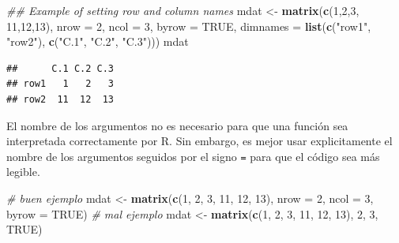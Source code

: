 \documentclass[
]{book}
\newenvironment{Shaded}{\begin{snugshade}}{\end{snugshade}}
\newcommand{\CommentTok}[1]{\textcolor[rgb]{0.56,0.35,0.01}{\textit{#1}}}
\newcommand{\DataTypeTok}[1]{\textcolor[rgb]{0.13,0.29,0.53}{#1}}
\newcommand{\DecValTok}[1]{\textcolor[rgb]{0.00,0.00,0.81}{#1}}
\newcommand{\KeywordTok}[1]{\textcolor[rgb]{0.13,0.29,0.53}{\textbf{#1}}}
\newcommand{\NormalTok}[1]{#1}
\newcommand{\OtherTok}[1]{\textcolor[rgb]{0.56,0.35,0.01}{#1}}
\newcommand{\StringTok}[1]{\textcolor[rgb]{0.31,0.60,0.02}{#1}}
\begin{document}
\begin{Shaded}
\begin{Highlighting}[]
\CommentTok{## Example of setting row and column names}
\NormalTok{mdat <-}\StringTok{ }\KeywordTok{matrix}\NormalTok{(}\KeywordTok{c}\NormalTok{(}\DecValTok{1}\NormalTok{,}\DecValTok{2}\NormalTok{,}\DecValTok{3}\NormalTok{, }\DecValTok{11}\NormalTok{,}\DecValTok{12}\NormalTok{,}\DecValTok{13}\NormalTok{), }\DataTypeTok{nrow =} \DecValTok{2}\NormalTok{, }\DataTypeTok{ncol =} \DecValTok{3}\NormalTok{, }\DataTypeTok{byrow =} \OtherTok{TRUE}\NormalTok{,}
               \DataTypeTok{dimnames =} \KeywordTok{list}\NormalTok{(}\KeywordTok{c}\NormalTok{(}\StringTok{"row1"}\NormalTok{, }\StringTok{"row2"}\NormalTok{),}
                               \KeywordTok{c}\NormalTok{(}\StringTok{"C.1"}\NormalTok{, }\StringTok{"C.2"}\NormalTok{, }\StringTok{"C.3"}\NormalTok{)))}
\NormalTok{mdat}
\end{Highlighting}
\end{Shaded}

\begin{verbatim}
##      C.1 C.2 C.3
## row1   1   2   3
## row2  11  12  13
\end{verbatim}

El nombre de los argumentos no es necesario para que una función sea interpretada correctamente por R. Sin embargo, es mejor usar explicitamente el nombre de los argumentos seguidos por el signo \texttt{=} para que el código sea más legible.

\begin{Shaded}
\begin{Highlighting}[]
\CommentTok{# buen ejemplo}
\NormalTok{mdat <-}\StringTok{ }\KeywordTok{matrix}\NormalTok{(}\KeywordTok{c}\NormalTok{(}\DecValTok{1}\NormalTok{, }\DecValTok{2}\NormalTok{, }\DecValTok{3}\NormalTok{, }\DecValTok{11}\NormalTok{, }\DecValTok{12}\NormalTok{, }\DecValTok{13}\NormalTok{), }\DataTypeTok{nrow =} \DecValTok{2}\NormalTok{, }\DataTypeTok{ncol =} \DecValTok{3}\NormalTok{, }\DataTypeTok{byrow =} \OtherTok{TRUE}\NormalTok{)}
\CommentTok{# mal ejemplo}
\NormalTok{mdat <-}\StringTok{ }\KeywordTok{matrix}\NormalTok{(}\KeywordTok{c}\NormalTok{(}\DecValTok{1}\NormalTok{, }\DecValTok{2}\NormalTok{, }\DecValTok{3}\NormalTok{, }\DecValTok{11}\NormalTok{, }\DecValTok{12}\NormalTok{, }\DecValTok{13}\NormalTok{), }\DecValTok{2}\NormalTok{, }\DecValTok{3}\NormalTok{, }\OtherTok{TRUE}\NormalTok{)}
\end{Highlighting}
\end{Shaded}
\end{document}
